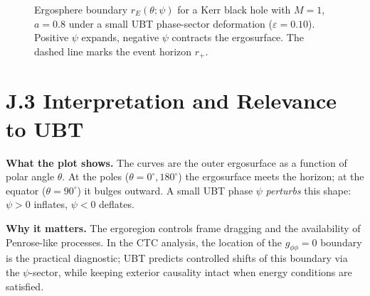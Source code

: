 \begin{figure}[h!]
\centering
{}
\caption{Ergosphere boundary $r_E(\theta;\psi)$ for a Kerr black hole with $M=1$, $a=0.8$ under a small UBT phase-sector deformation ($\varepsilon=0.10$). Positive $\psi$ expands, negative $\psi$ contracts the ergosurface. The dashed line marks the event horizon $r_+$.}
\label{fig:pgf_ergo}
\end{figure}

\section*{J.3 Interpretation and Relevance to UBT}
\textbf{What the plot shows.} The curves are the outer ergosurface as a function of polar angle $\theta$. 
At the poles ($\theta=0^\circ,180^\circ$) the ergosurface meets the horizon; at the equator ($\theta=90^\circ$) it bulges outward. 
A small UBT phase $\psi$ \emph{perturbs} this shape: $\psi>0$ inflates, $\psi<0$ deflates.

\textbf{Why it matters.} The ergoregion controls frame dragging and the availability of Penrose-like processes. 
In the CTC analysis, the location of the $g_{\phi\phi}=0$ boundary is the practical diagnostic; 
UBT predicts controlled shifts of this boundary via the $\psi$-sector, while keeping exterior causality intact when energy conditions are satisfied.
